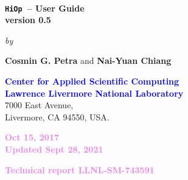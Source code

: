 \documentclass[11pt]{article}
\newcommand{\Hi}{\texttt{HiOp}\xspace}
\begin{document}

\begin{titlepage}



\begin{center}
\ 
\vspace{3cm}

  {\huge\bfseries \Hi\ -- User Guide} \\[14pt]
  {\large\bfseries version 0.5}

\vspace{3cm}

{\large\emph{by}}

\vspace{1.25cm}

 {\Large\bfseries Cosmin G. Petra} and {\Large\bfseries Nai-Yuan Chiang}
 
\vspace{1.1cm}

{\bfseries\Large{\textcolor{blue}{Center for Applied Scientific Computing\\
Lawrence Livermore National Laboratory}}}\\[10pt]


{\Large{7000 East Avenue, \\Livermore, CA 94550, USA.}}


\vspace{4.75cm}

 \textcolor{violet}{{\large\bfseries Oct 15, 2017} \\
{\large\bfseries Updated  Sept 28, 2021}}

\vspace{0.75cm}

{\Large\bfseries \textcolor{violet}{Technical report LLNL-SM-743591}}





\end{center}
\end{titlepage}

\newpage

 \ 
 
\bigskip

\bigskip


\end{document}
